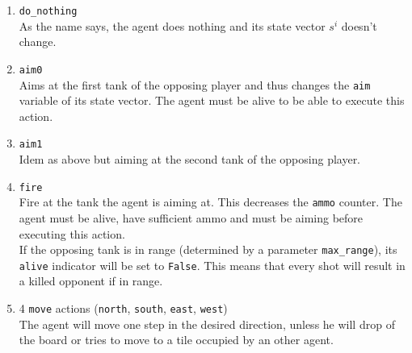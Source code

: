 \begin{enumerate}
    \item {\tt do\_nothing}\\
        As the name says, the agent does nothing and its state vector $s^i$ doesn't change.
    \item {\tt aim0} \\
        Aims at the first tank of the opposing player and thus changes the {\tt aim} variable of its state vector. The agent must be alive to be able to execute this action.
    \item {\tt aim1} \\
        Idem as above but aiming at the second tank of the opposing player.
    \item {\tt fire} \\
        Fire at the tank the agent is aiming at. This decreases the {\tt ammo} counter. The agent must be alive, have sufficient ammo and must be aiming before executing this action.\\
        If the opposing tank is in range (determined by a parameter {\tt max\_range}), its {\tt alive} indicator will be set to {\tt False}. This means that every shot will result in a killed opponent if in range.
    \item 4 {\tt move} actions ({\tt north}, {\tt south}, {\tt east}, {\tt west})\\
        The agent will move one step in the desired direction, unless he will drop of the board or tries to move to a tile occupied by an other agent.
\end{enumerate}

